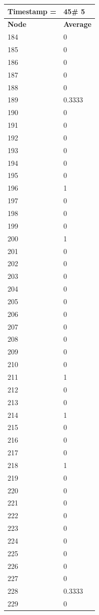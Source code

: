 \begin{tabular}{|l||l|}
\hline
\textbf{Timestamp =} & \textbf{45}\# 5\\\hline
	\textbf{Node} & \textbf{Average} \\ \hline
\hline
	184 & 0 \\ \hline
	185 & 0 \\ \hline
	186 & 0 \\ \hline
	187 & 0 \\ \hline
	188 & 0 \\ \hline
	189 & 0.3333 \\ \hline
	190 & 0 \\ \hline
	191 & 0 \\ \hline
	192 & 0 \\ \hline
	193 & 0 \\ \hline
	194 & 0 \\ \hline
	195 & 0 \\ \hline
	196 & 1 \\ \hline
	197 & 0 \\ \hline
	198 & 0 \\ \hline
	199 & 0 \\ \hline
	200 & 1 \\ \hline
	201 & 0 \\ \hline
	202 & 0 \\ \hline
	203 & 0 \\ \hline
	204 & 0 \\ \hline
	205 & 0 \\ \hline
	206 & 0 \\ \hline
	207 & 0 \\ \hline
	208 & 0 \\ \hline
	209 & 0 \\ \hline
	210 & 0 \\ \hline
	211 & 1 \\ \hline
	212 & 0 \\ \hline
	213 & 0 \\ \hline
	214 & 1 \\ \hline
	215 & 0 \\ \hline
	216 & 0 \\ \hline
	217 & 0 \\ \hline
	218 & 1 \\ \hline
	219 & 0 \\ \hline
	220 & 0 \\ \hline
	221 & 0 \\ \hline
	222 & 0 \\ \hline
	223 & 0 \\ \hline
	224 & 0 \\ \hline
	225 & 0 \\ \hline
	226 & 0 \\ \hline
	227 & 0 \\ \hline
	228 & 0.3333 \\ \hline
	229 & 0 \\ \hline
\end{tabular}
